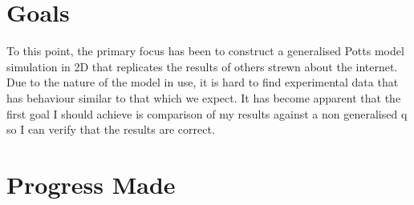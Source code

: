 \documentclass[10pt,a4paper]{article}
\begin{document}


\section{Goals}
To this point, the primary focus has been to construct a generalised Potts model simulation in 2D that replicates the results of others strewn about the internet.
Due to the nature of the model in use, it is hard to find experimental data that has behaviour similar to that which we expect. It has become apparent that the first goal I should achieve is comparison of my results against a non generalised q so I can verify that the results are correct.

\section{Progress Made}
\end{document}
